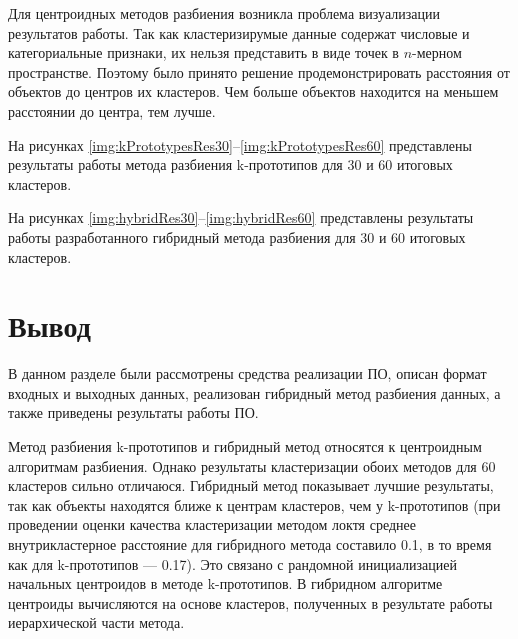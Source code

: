 Для центроидных методов разбиения возникла проблема визуализации результатов работы. Так как кластеризирумые данные содержат числовые и категориальные признаки, их нельзя представить в виде точек в $n$-мерном пространстве. Поэтому было принято решение продемонстрировать расстояния от объектов до центров их кластеров. Чем больше объектов находится на меньшем расстоянии до центра, тем лучше.

\clearpage
На рисунках \ref{img:kPrototypesRes30}--\ref{img:kPrototypesRes60} представлены результаты работы метода разбиения k-прототипов для 30 и 60 итоговых кластеров.

\clearpage
На рисунках \ref{img:hybridRes30}--\ref{img:hybridRes60} представлены результаты работы разработанного гибридный
метода разбиения для 30 и 60 итоговых кластеров.

\clearpage
\section*{Вывод}

В данном разделе были рассмотрены средства реализации ПО, описан формат входных и выходных данных, реализован гибридный метод разбиения данных, а также приведены результаты работы ПО. 

Метод разбиения k-прототипов и гибридный метод относятся к центроидным алгоритмам разбиения. Однако результаты кластеризации обоих методов для 60 кластеров сильно отличаюся. Гибридный метод показывает лучшие результаты, так как объекты находятся ближе к центрам кластеров, чем у k-прототипов (при проведении оценки качества кластеризации методом локтя среднее внутрикластерное расстояние для гибридного метода составило 0.1, в то время как для k-прототипов --- 0.17). Это связано с рандомной инициализацией начальных центроидов в методе k-прототипов. В гибридном алгоритме центроиды вычисляются на основе кластеров, полученных в результате работы иерархической части метода.
